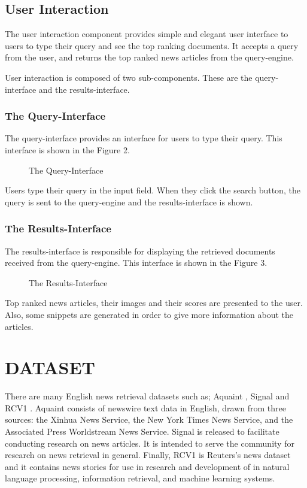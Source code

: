 \documentclass[conference]{IEEEtran}
\begin{document}
\subsection{User Interaction}
The user interaction component provides simple and elegant user interface to users to type their query and see the top ranking documents. It accepts a query from the user, and returns the top ranked news articles from the query-engine.

User interaction is composed of two sub-components. These are the query-interface and the results-interface.

\subsubsection{The Query-Interface}
The query-interface provides an interface for users to type their query. This interface is shown in the Figure 2.

 \begin{figure}[hbt!]
     \centering
     \caption{The Query-Interface}
     \label{fig:my_label}
 \end{figure}

Users type their query in the input field. When they click the search button, the query is sent to the query-engine and the results-interface is shown.

\subsubsection{The Results-Interface}
The results-interface is responsible for displaying the retrieved documents received from the query-engine. This interface is shown in the Figure 3.

 \begin{figure}[h!]
     \centering
     \caption{The Results-Interface}
     \label{fig:my_label}
 \end{figure}

Top ranked news articles, their images and their scores are presented to the user. Also, some snippets are generated in order to give more information about the articles.

\section{DATASET}

There are many English news retrieval datasets such as; Aquaint \cite{aquaint}, Signal \cite{signal} and RCV1 \cite{rcv1}. Aquaint consists of newswire text data in English, drawn from three sources: the Xinhua News Service, the New York Times News Service, and the Associated Press Worldstream News Service. Signal is released to facilitate conducting research on news articles. It is intended to serve the community for research on news retrieval in general. Finally, RCV1 is Reuters’s news dataset and it contains news stories for use in research and development of in natural language processing, information retrieval, and machine learning systems.
\end{document}

